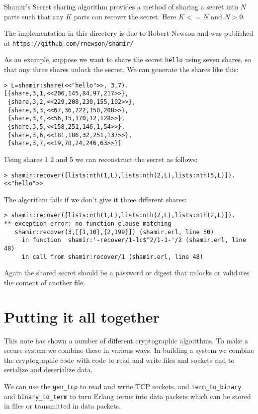 \documentclass[12pt]{article}
\begin{document}
Shamir's Secret sharing algorithm provides a method of sharing a
secret into $N$ parts such that any $K$ parts can recover the
secret. Here $K <= N$ and $N > 0$.

The implementation in this directory is due to Robert Newson and was
published at \verb+https://github.com/rnewson/shamir/+

As an example, suppose we want to share the secret \verb+hello+ using
seven shares, so that any three shares unlock the secret. We can
generate the shares like this:

\begin{Verbatim}[frame=single]
> L=shamir:share(<<"hello">>, 3,7).                                                
[{share,3,1,<<206,145,84,97,217>>},
 {share,3,2,<<229,208,230,155,102>>},
 {share,3,3,<<67,36,222,150,208>>},
 {share,3,4,<<56,15,170,12,128>>},
 {share,3,5,<<158,251,146,1,54>>},
 {share,3,6,<<181,186,32,251,137>>},
 {share,3,7,<<19,78,24,246,63>>}]
\end{Verbatim}

Using shares 1 2 and 5 we can reconstruct the secret as follows:

\begin{Verbatim}[frame=single]
> shamir:recover([lists:nth(1,L),lists:nth(2,L),lists:nth(5,L)]).
<<"hello">>
\end{Verbatim}

The algorithm fails if we don't give it three different shares:

\begin{Verbatim}[frame=single]
> shamir:recover([lists:nth(1,L),lists:nth(2,L),lists:nth(2,L)]).
** exception error: no function clause matching
   shamir:recover(3,[{1,10},{2,199}]) (shamir.erl, line 50)
     in function  shamir:'-recover/1-lc$^2/1-1-'/2 (shamir.erl, line 48)
     in call from shamir:recover/1 (shamir.erl, line 48)
\end{Verbatim}

Again the shared secret should be a password or digest that unlocks or
validates the content of another file.

\section{Putting it all together}

This note has shown a number of different cryptographic algorithms.
To make a secure system we combine these in various ways. In building a system
we combine the cryptographic code with code to read and write files and sockets
and to serialize and deserialize data.

We can use the \verb+gen_tcp+ to read and write TCP sockets, and
\verb+term_to_binary+ and \verb+binary_to_term+ to turn Erlang terms into
data packets which can be stored in files or transmitted in data packets.
\end{document}
